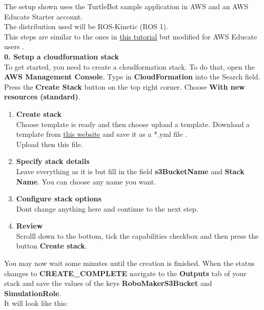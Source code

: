 \documentclass[plainarticle,zihtitle,english,final,hyperref,utf8]{zihpub}
\begin{document}
\newpage
{}
The setup shown uses the TurtleBot sample application in AWS and an AWS Educate Starter account.\\ The distribution used will be ROS-Kinetic (ROS 1).\\
\newline
This steps are similar to the ones in \href{ https://robomakerworkshops.com/workshop/}{this tutorial} but modified for AWS Educate users \cite{workshopaws}.\\
\newline
\textbf{0. Setup a cloudformation stack}\\
\newline
To get started, you need to create a cloudformation stack. To do that, open the \textbf{AWS Management Console}. Type in \textbf{CloudFormation} into the Search field.\\
Press the \textbf{Create Stack} button on the top right corner. Choose \textbf{With new resources (standard)}. 
\begin{enumerate}
    \item \textbf{Create stack}\\
    Choose template is ready and then choose upload a template. Download a template from \href{https://s3.amazonaws.com/assets.robomakerworkshops.com/cfn/bootstrap.cfn.yaml}{this website} and save it as a *.yml file \cite{workshopawsyml}.\\
    Upload then this file.
    \item \textbf{Specify stack details}\\
    Leave everything as it is but fill in the field \textbf{s3BucketName} and \textbf{Stack Name}. You can choose any name you want. 
    \item \textbf{Configure stack options}\\
    Dont change anything here and continue to the next step.
    \item \textbf{Review}\\
    Scrolll down to the bottom, tick the capabilities checkbox and then press the button \textbf{Create stack}.\\
\end{enumerate}
You may now wait some minutes until the creation is finished. When the status changes to \textbf{CREATE\_COMPLETE} navigate to the \textbf{Outputs} tab of your stack and save the values of the keys \textbf{RoboMakerS3Bucket} and \textbf{SimulationRole}.\\
It will look like this:
\end{document}
